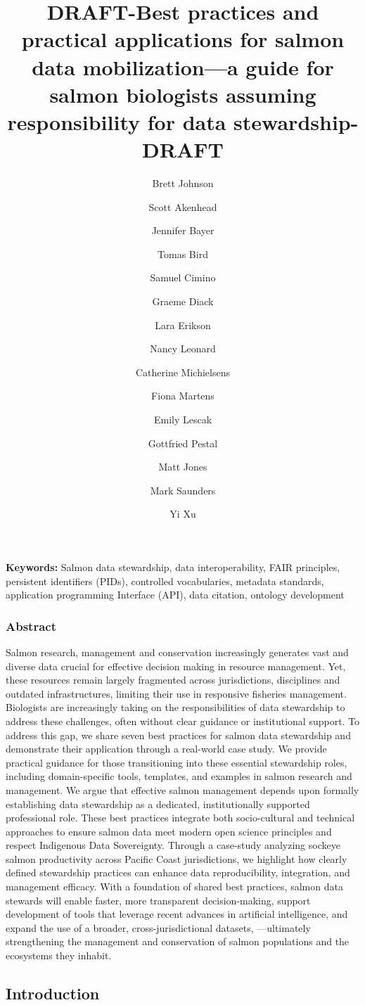 \documentclass[
  letterpaper,
  DIV=11,
  numbers=noendperiod]{scrartcl}
\title{DRAFT-Best practices and practical applications for salmon data
mobilization---a guide for salmon biologists assuming responsibility for
data stewardship-DRAFT}
\author{Brett Johnson \and Scott Akenhead \and Jennifer Bayer \and Tomas
Bird \and Samuel Cimino \and Graeme Diack \and Lara Erikson \and Nancy
Leonard \and Catherine Michielsens \and Fiona Martens \and Emily
Lescak \and Gottfried Pestal \and Matt Jones \and Mark Saunders \and Yi
Xu}
\date{}
\begin{document}
\maketitle


\textbf{Keywords:} Salmon data stewardship, data interoperability, FAIR
principles, persistent identifiers (PIDs), controlled vocabularies,
metadata standards, application programming Interface (API), data
citation, ontology development

\subsubsection{Abstract}\label{abstract}

Salmon research, management and conservation increasingly generates vast
and diverse data crucial for effective decision making in resource
management. Yet, these resources remain largely fragmented across
jurisdictions, disciplines and outdated infrastructures, limiting their
use in responsive fisheries management. Biologists are increasingly
taking on the responsibilities of data stewardship to address these
challenges, often without clear guidance or institutional support. To
address this gap, we share seven best practices for salmon data
stewardship and demonstrate their application through a real-world case
study. We provide practical guidance for those transitioning into these
essential stewardship roles, including domain-specific tools, templates,
and examples in salmon research and management. We argue that effective
salmon management depends upon formally establishing data stewardship as
a dedicated, institutionally supported professional role. These best
practices integrate both socio-cultural and technical approaches to
ensure salmon data meet modern open science principles and respect
Indigenous Data Sovereignty. Through a case-study analyzing sockeye
salmon productivity across Pacific Coast jurisdictions, we highlight how
clearly defined stewardship practices can enhance data reproducibility,
integration, and management efficacy. With a foundation of shared best
practices, salmon data stewards will enable faster, more transparent
decision-making, support development of tools that leverage recent
advances in artificial intelligence, and expand the use of a broader,
cross-jurisdictional datasets, ---ultimately strengthening the
management and conservation of salmon populations and the ecosystems
they inhabit.

\subsection{Introduction}\label{introduction}
\end{document}
